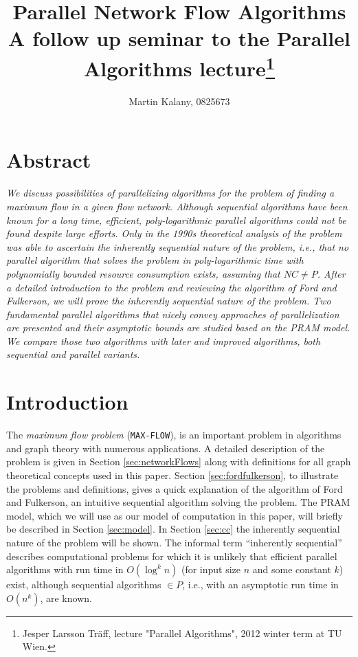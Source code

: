 \documentclass[a4paper,10pt, twocolumn]{article}
\title{Parallel Network Flow Algorithms \\ 
\large A follow up seminar to the Parallel Algorithms lecture\footnote{Jesper Larsson Träff, lecture "Parallel Algorithms", 2012 winter term at TU Wien.}}
\author{Martin Kalany, 0825673}
\begin{document}
\maketitle

\section{Abstract}
\label{sec:abstract}
\textit{We discuss possibilities of parallelizing algorithms for the problem of finding a maximum flow in a given flow network. Although sequential algorithms have been known for a long time, efficient, poly-logarithmic parallel algorithms could not be found despite large efforts. Only in the 1990s theoretical analysis of the problem was able to ascertain the inherently sequential nature of the problem, i.e., that no parallel algorithm that solves the problem in poly-logarithmic time with polynomially bounded resource consumption exists, assuming that $NC \neq P$. After a detailed introduction to the problem and reviewing the algorithm of Ford and Fulkerson, we will prove the inherently sequential nature of the problem. Two fundamental parallel algorithms that nicely convey approaches of parallelization are presented and their asymptotic bounds are studied based on the PRAM model. We compare those two algorithms with later and improved algorithms, both sequential and parallel variants.}


\section{Introduction}
\label{sec:intro}
The \emph{maximum flow problem} (\lstinline|MAX-FLOW|), is an important problem in algorithms and graph theory with numerous applications\cite{ahuja93}. A detailed description of the problem is given in Section \ref{sec:networkFlows} along with definitions for all graph theoretical concepts used in this paper. Section \ref{sec:fordfulkerson}, to illustrate the problems and definitions, gives a quick explanation of the algorithm of Ford and Fulkerson, an intuitive sequential algorithm solving the problem. The PRAM model, which we will use as our model of computation in this paper, will briefly be described in Section \ref{sec:model}. In Section \ref{sec:cc} the inherently sequential nature of the problem will be shown. The informal term ``inherently sequential'' describes computational problems for which it is unlikely that efficient parallel algorithms with run time in $O(\log^{k}n)$ (for input size $n$ and some constant $k$) exist, although sequential algorithms $\in P$, i.e., with an asymptotic run time in $O(n^{k})$, are known.
\end{document}
